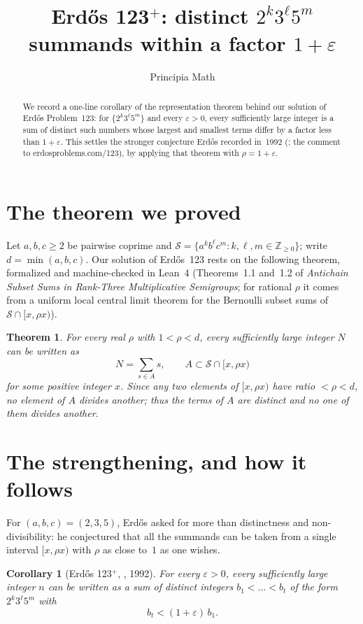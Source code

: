 \documentclass[11pt,reqno]{amsart}
\title[Erd\H{o}s 123$^{+}$]{Erd\H{o}s 123$^{+}$: distinct $2^{k}3^{\ell}5^{m}$
summands within a factor $1+\varepsilon$}
\author{Principia Math}
\date{}
\newtheorem{theorem}{Theorem}
\newtheorem{corollary}{Corollary}
\newcommand{\Sg}{\mathcal S}
\newcommand{\Nzero}{\mathbb Z_{\ge 0}}
\begin{document}
\begin{abstract}
We record a one-line corollary of the representation theorem behind our solution of
Erd\H{o}s Problem~123: for $\{2^{k}3^{\ell}5^{m}\}$ and every $\varepsilon>0$, every
sufficiently large integer is a sum of distinct such numbers whose largest and smallest
terms differ by a factor less than $1+\varepsilon$.  This settles the stronger conjecture
Erd\H{o}s recorded in~1992 (\cite{Er92b}; the comment to erdosproblems.com/123), by
applying that theorem with $\rho=1+\varepsilon$.
\end{abstract}

\maketitle

\section*{The theorem we proved}

Let $a,b,c\ge2$ be pairwise coprime and
$\Sg=\{a^{k}b^{\ell}c^{m}:k,\ell,m\in\Nzero\}$; write $d=\min(a,b,c)$.  Our solution of
Erd\H{o}s~123 rests on the following theorem, formalized and machine-checked in Lean~4
(Theorems~1.1 and~1.2 of \emph{Antichain Subset Sums in Rank-Three Multiplicative
Semigroups}; for rational $\rho$ it comes from a uniform local central limit theorem for
the Bernoulli subset sums of $\Sg\cap[x,\rho x)$).

\begin{theorem}\label{thm:rep}
For every real $\rho$ with $1<\rho<d$, every sufficiently large integer $N$ can be written
as
\[
  N=\sum_{s\in A}s,\qquad A\subset \Sg\cap[x,\rho x)
\]
for some positive integer $x$.  Since any two elements of $[x,\rho x)$ have ratio
$<\rho<d$, no element of $A$ divides another; thus the terms of $A$ are distinct and no
one of them divides another.
\end{theorem}

\section*{The strengthening, and how it follows}

For $(a,b,c)=(2,3,5)$, Erd\H{o}s asked for more than distinctness and non-divisibility: he
conjectured that all the summands can be taken from a single interval $[x,\rho x)$ with
$\rho$ as close to~$1$ as one wishes.

\begin{corollary}[Erd\H{o}s 123$^{+}$, \cite{Er92b}, 1992]\label{cor:plus}
For every $\varepsilon>0$, every sufficiently large integer $n$ can be written as a sum of
distinct integers $b_{1}<\dots<b_{t}$ of the form $2^{k}3^{\ell}5^{m}$ with
\[
  b_{t}<(1+\varepsilon)\,b_{1}.
\]
\end{corollary}
\end{document}
